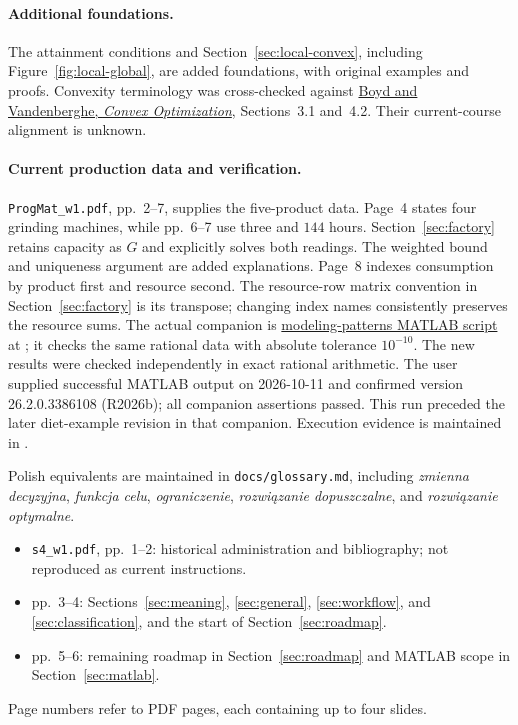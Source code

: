 \documentclass[11pt,a4paper]{article}
\begin{document}
\paragraph{Additional foundations.}
The attainment conditions and Section~\ref{sec:local-convex}, including
Figure~\ref{fig:local-global}, are added foundations, with original examples
and proofs. Convexity terminology was cross-checked against
\href{https://web.stanford.edu/~boyd/cvxbook/}{Boyd and Vandenberghe,
  \emph{Convex Optimization}}, Sections~3.1 and~4.2.
Their current-course alignment is unknown.

\paragraph{Current production data and verification.}
\texttt{ProgMat\_w1.pdf}, pp.~2--7, supplies the five-product data.
Page~4 states four grinding machines, while pp.~6--7 use three and $144$ hours.
Section~\ref{sec:factory} retains capacity as $G$ and explicitly solves both
readings. The weighted bound and uniqueness argument are added explanations.
Page~8 indexes consumption by product first and resource second. The resource-row
matrix convention in Section~\ref{sec:factory} is its transpose; changing index
names consistently preserves the resource sums.
The actual companion is
\href{run:matlab/exercises/modeling_patterns_checks.m}{modeling-patterns MATLAB script} at ;
it checks the same rational data with absolute tolerance $10^{-10}$.
The new results were checked independently in exact rational arithmetic.
The user supplied successful MATLAB output on 2026-10-11 and confirmed version
26.2.0.3386108 (R2026b); all companion assertions passed.
This run preceded the later diet-example revision in that companion.
Execution evidence is maintained in .

Polish equivalents are maintained in \texttt{docs/glossary.md}, including
\emph{zmienna decyzyjna}, \emph{funkcja celu}, \emph{ograniczenie},
\emph{rozwi\k{a}zanie dopuszczalne}, and \emph{rozwi\k{a}zanie optymalne}.
\begin{itemize}[leftmargin=1.6em]
  \item \texttt{s4\_w1.pdf}, pp.~1--2: historical administration and bibliography;
        not reproduced as current instructions.
  \item pp.~3--4: Sections~\ref{sec:meaning}, \ref{sec:general}, \ref{sec:workflow},
        and \ref{sec:classification}, and the start of
        Section~\ref{sec:roadmap}.
  \item pp.~5--6: remaining roadmap in Section~\ref{sec:roadmap} and MATLAB scope in
        Section~\ref{sec:matlab}.
\end{itemize}
Page numbers refer to PDF pages, each containing up to four slides.
\end{document}
